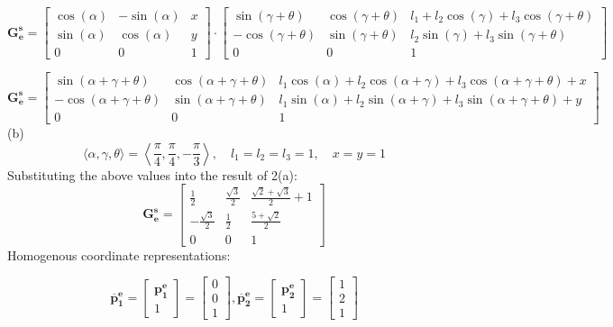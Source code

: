 \documentclass{article}
\begin{document}
\[
\bm{\mathbf{G^{s}_{e}}} = 
\begin{bmatrix}
\cos(\alpha) & -\sin(\alpha) & x \\
\sin(\alpha) & \cos(\alpha)  & y \\
0 & 0 & 1
\end{bmatrix} \cdot
\begin{bmatrix}
\sin(\gamma + \theta) & \cos(\gamma + \theta) & l_1 + l_2 \cos(\gamma) + l_3 \cos(\gamma + \theta) \\
-\cos(\gamma + \theta) & \sin(\gamma + \theta) & l_2 \sin(\gamma) + l_3 \sin(\gamma + \theta) \\
0 & 0 & 1
\end{bmatrix}
\]

\[
\bm{\mathbf{G^{s}_{e}}} = 
\begin{bmatrix}
\sin(\alpha + \gamma + \theta) & \cos(\alpha + \gamma + \theta) & l_1\cos(\alpha) + l_2 \cos(\alpha + \gamma) + l_3 \cos(\alpha + \gamma + \theta) + x \\
-\cos(\alpha + \gamma + \theta) & \sin(\alpha + \gamma + \theta) & l_1\sin(\alpha) + l_2 \sin(\alpha + \gamma) + l_3 \sin(\alpha + \gamma + \theta) + y \\
0 & 0 & 1
\end{bmatrix}
\]
(b)
\[
\langle \alpha, \gamma, \theta \rangle = \left\langle \frac{\pi}{4}, \frac{\pi}{4}, -\frac{\pi}{3} \right\rangle, \quad l_1 = l_2 = l_3 = 1, \quad x = y = 1
\]
Substituting the above values into the result of 2(a):
\[
\bm{\mathbf{G^{s}_{e}}} = 
\begin{bmatrix}
\frac{1}{2} & \frac{\sqrt{3}}{2} & \frac{\sqrt{2} + \sqrt{3}}{2} + 1 \\
-\frac{\sqrt{3}}{2} & \frac{1}{2} & \frac{5+\sqrt{2}}{2} \\
0 & 0 & 1
\end{bmatrix}
\]
Homogenous coordinate representations:

\[
\bm{\mathbf{\overline{p}^{e}_{1}}}
= \begin{bmatrix}
    \bm{\mathbf{p^e_1}} \\ 1
\end{bmatrix}
= \begin{bmatrix}
    0 \\ 0 \\ 1
\end{bmatrix},
\bm{\mathbf{\overline{p}^{e}_{2}}}
= \begin{bmatrix}
    \bm{\mathbf{p^e_2}} \\ 1
\end{bmatrix}
= \begin{bmatrix}
    1 \\ 2 \\ 1
\end{bmatrix}
\]
\end{document}
